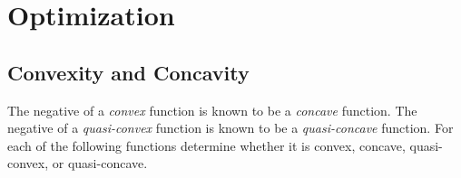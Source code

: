 \renewcommand{\chaptername}{Assignment}
\chapter{Optimization}


\section{Convexity and Concavity}
The negative of a \emph{convex} function is known to be a \emph{concave} function.
The negative of a \emph{quasi-convex} function is known to be a \emph{quasi-concave} function.
For each of the following functions determine whether it is convex, concave, quasi-convex, or quasi-concave.
